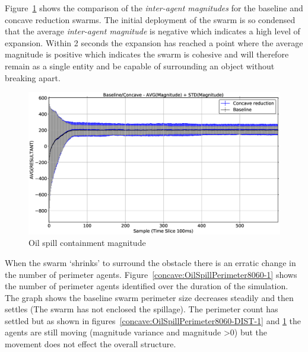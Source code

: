 Figure~\ref{concave:OilSpillPerimeter8060-MAG-1} shows the comparison of the \textit{inter-agent magnitudes} for the baseline and concave reduction swarms. The initial deployment of the swarm is so condensed that the average \textit{inter-agent magnitude} is negative which indicates a high level of expansion. Within 2 seconds the expansion has reached a point where the average magnitude is positive which indicates the swarm is cohesive and will therefore remain as a single entity and be capable of surrounding an object without breaking apart.
\begin{figure}[H]
\begin{center}
\includegraphics[width=14cm]{CHAPTER-7/figures/OilSpillPerimeter8060-MAG-1}
\end{center}
\caption{Oil spill containment magnitude\label{concave:OilSpillPerimeter8060-MAG-1}}
\end{figure}

When the swarm `shrinks' to surround the obstacle there is an erratic change in the number of perimeter agents. Figure~\ref{concave:OilSpillPerimeter8060-1} shows the number of perimeter agents identified over the duration of the simulation. The graph shows the baseline swarm perimeter size decreases steadily and then settles (The swarm has not enclosed the spillage). The perimeter count has settled but as shown in figures~\ref{concave:OilSpillPerimeter8060-DIST-1} and \ref{concave:OilSpillPerimeter8060-MAG-1} the agents are still moving (magnitude variance and magnitude \textgreater 0) but the movement does not effect the overall structure. 


